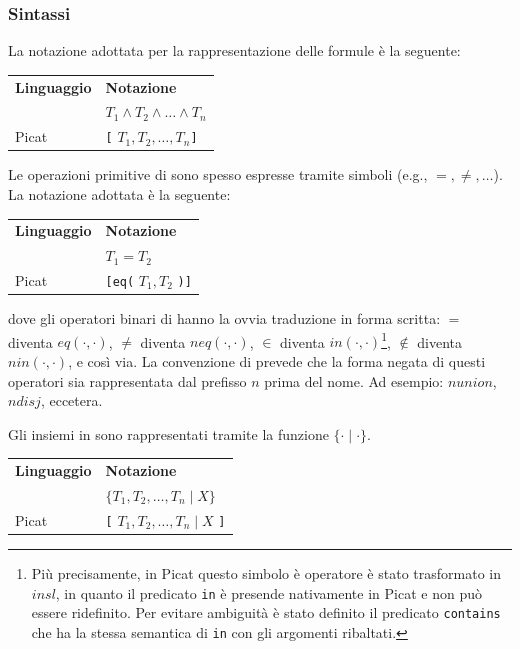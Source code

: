 \documentclass[12pt,a4paper,openright]{book} %
\begin{document}
\subsubsection{Sintassi}

La notazione adottata per la rappresentazione delle formule è la
seguente:

\begin{table}[H]
	\center
	\begin{tabular}{ll}
		\textbf{Linguaggio} & \textbf{Notazione} \\
		\lset{} & $T_1 \land T_2 \land \ldots \land T_n$ \\
		Picat & \verb|[| $T_1, T_2, \ldots, T_n$\verb|]| \\
	\end{tabular}
\end{table}

Le operazioni primitive di \clpset{} sono spesso espresse tramite
simboli (e.g., $=, \neq, \ldots$). La notazione adottata è la
seguente:
\begin{table}[H]
	\center
	\begin{tabular}{l l}
		\textbf{Linguaggio} & \textbf{Notazione} \\
		\lset{} & $T_1 = T_2$ \\
		Picat & \verb|[eq(| $T_1, T_2$ \verb|)]| \\
	\end{tabular}
\end{table}
dove gli operatori binari di \lset{} hanno la ovvia traduzione in
forma scritta: $=$ diventa $eq(\cdot, \cdot)$, $\neq$ diventa
$neq(\cdot, \cdot)$, $\in$ diventa $in(\cdot, \cdot)$\footnote{Più
  precisamente, in Picat questo simbolo è operatore è stato
  trasformato in $insl$, in quanto il predicato \texttt{in} è presende
  nativamente in Picat e non può essere ridefinito. Per evitare
  ambiguità è stato definito il predicato \texttt{contains} che ha la
  stessa semantica di \texttt{in} con gli argomenti ribaltati.},
$\not\in$ diventa $nin(\cdot, \cdot)$, e così via. La convenzione di
\lset{} prevede che la forma negata di questi operatori sia
rappresentata dal prefisso $n$ prima del nome. Ad esempio: $nunion$,
$ndisj$, eccetera.

Gli insiemi in \clpset{} sono rappresentati tramite la funzione $\{
\cdot \mid \cdot \}$.

\begin{table}[H]
	\center
	\begin{tabular}{l l}
		\textbf{Linguaggio} & \textbf{Notazione} \\
		\lset{} & $\{ T_1, T_2, \ldots, T_n \mid X \}$ \\
		Picat & \verb|[| $T_1, T_2, \ldots, T_n \mid X$ \verb|]| \\
	\end{tabular}
\end{table}
\end{document}
